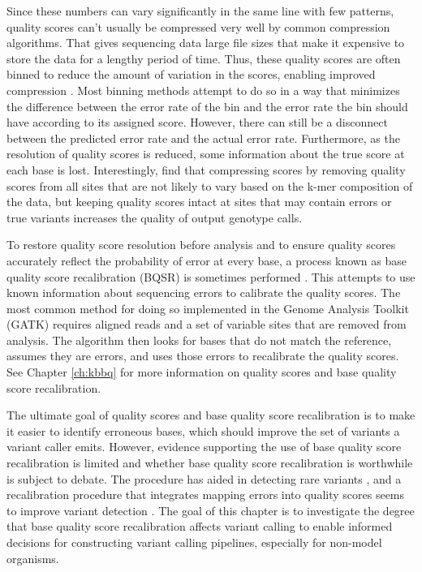 Since these numbers can vary significantly in the same line with few patterns, quality scores can't usually be compressed very well by common compression algorithms. That gives sequencing data large file sizes that make it expensive to store the data for a lengthy period of time. Thus, these quality scores are often binned to reduce the amount of variation in the scores, enabling improved compression \parencite{shibuya_better_2019, malysa_qvz_2015, yu_quality_2015, noauthor_reducing_2014}. Most binning methods attempt to do so in a way that minimizes the difference between the error rate of the bin and the error rate the bin should have according to its assigned score. However, there can still be a disconnect between the predicted error rate and the actual error rate. Furthermore, as the resolution of quality scores is reduced, some information about the true score at each base is lost. Interestingly, \cite{yu_quality_2015} find that compressing scores by removing quality scores from all sites that are not likely to vary based on the k-mer composition of the data, but keeping quality scores intact at sites that may contain errors or true variants increases the quality of output genotype calls.

To restore quality score resolution before analysis and to ensure quality scores accurately reflect the probability of error at every base, a process known as base quality score recalibration (BQSR) is sometimes performed \parencite{auwera_fastq_2013, pfeifer_next-generation_2017}. This attempts to use known information about sequencing errors to calibrate the quality scores. The most common method for doing so implemented in the Genome Analysis Toolkit (GATK) requires aligned reads and a set of variable sites that are removed from analysis. The algorithm then looks for bases that do not match the reference, assumes they are errors, and uses those errors to recalibrate the quality scores. See Chapter \ref{ch:kbbq} for more information on quality scores and base quality score recalibration.
	
The ultimate goal of quality scores and base quality score recalibration is to make it easier to identify erroneous bases, which should improve the set of variants a variant caller emits. However, evidence supporting the use of base quality score recalibration is limited and whether base quality score recalibration is worthwhile is subject to debate. The procedure has aided in detecting rare variants \parencite{ni_improvement_2016}, and a recalibration procedure that integrates mapping errors into quality scores seems to improve variant detection \parencite{li_improving_2011}. The goal of this chapter is to investigate the degree that base quality score recalibration affects variant calling to enable informed decisions for constructing variant calling pipelines, especially for non-model organisms.

